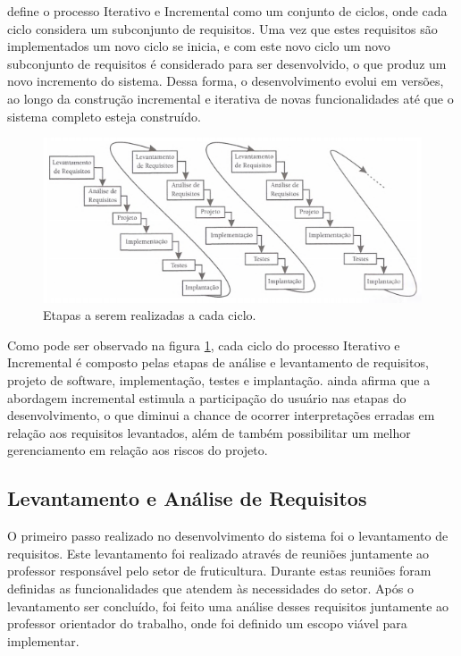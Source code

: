  define o processo Iterativo e Incremental como um conjunto de ciclos, onde cada ciclo considera um subconjunto de requisitos. Uma vez que estes requisitos são implementados um novo ciclo se inicia, e com este novo ciclo um novo subconjunto de requisitos é considerado para ser desenvolvido, o que produz um novo incremento do sistema. Dessa forma, o desenvolvimento evolui em versões, ao longo da construção incremental e iterativa de novas funcionalidades até que o sistema completo esteja construído.

\begin{figure}[H]
    \centering
    \includegraphics[scale=0.7]{04-figuras/iterativo-incremental.png}
    \caption{Etapas a serem realizadas a cada ciclo.}
    \vspace{-\baselineskip}
    \label{fig:iterativo-incremental}
\end{figure}

Como pode ser observado na figura \ref{fig:iterativo-incremental}, cada ciclo do processo Iterativo e Incremental é composto pelas etapas de análise e levantamento de requisitos, projeto de software, implementação, testes e implantação.  ainda afirma que a abordagem incremental estimula a participação do usuário nas etapas do desenvolvimento, o que diminui a chance de ocorrer interpretações erradas em relação aos requisitos levantados, além de também possibilitar um melhor gerenciamento em relação aos riscos do projeto.

\subsection{Levantamento e Análise de Requisitos}
O primeiro passo realizado no desenvolvimento do sistema foi o levantamento de requisitos. Este levantamento foi realizado através de reuniões juntamente ao professor responsável pelo setor de fruticultura. Durante estas reuniões foram definidas as funcionalidades que atendem às necessidades do setor. Após o levantamento ser concluído, foi feito uma análise desses requisitos juntamente ao professor orientador do trabalho, onde foi definido um escopo viável para implementar. 

